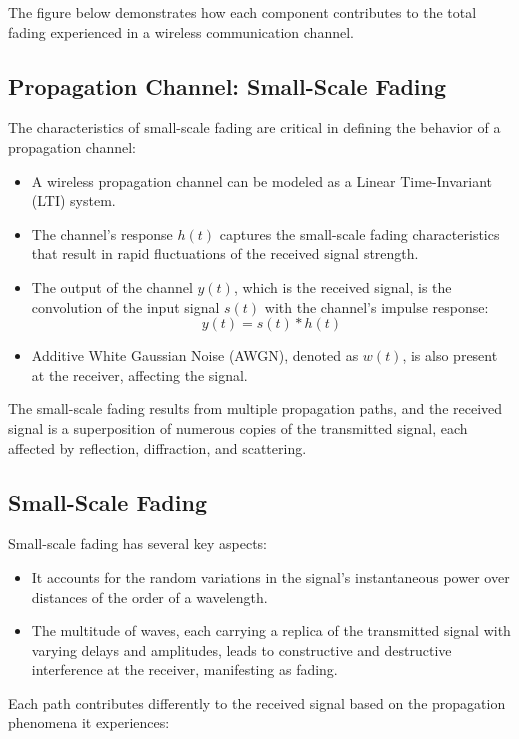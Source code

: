 The figure below demonstrates how each component contributes to the total fading experienced in a wireless communication channel.


\subsection*{Propagation Channel: Small-Scale Fading}

The characteristics of small-scale fading are critical in defining the behavior of a propagation channel:

\begin{itemize}
    \item A wireless propagation channel can be modeled as a Linear Time-Invariant (LTI) system.
    \item The channel's response \( h(t) \) captures the small-scale fading characteristics that result in rapid fluctuations of the received signal strength.
    \item The output of the channel \( y(t) \), which is the received signal, is the convolution of the input signal \( s(t) \) with the channel's impulse response:
    \[
    y(t) = s(t) \ast h(t)
    \]
    \item Additive White Gaussian Noise (AWGN), denoted as \( w(t) \), is also present at the receiver, affecting the signal.
\end{itemize}

The small-scale fading results from multiple propagation paths, and the received signal is a superposition of numerous copies of the transmitted signal, each affected by reflection, diffraction, and scattering.
\subsection*{Small-Scale Fading}

Small-scale fading has several key aspects:

\begin{itemize}
    \item It accounts for the random variations in the signal's instantaneous power over distances of the order of a wavelength.
    \item The multitude of waves, each carrying a replica of the transmitted signal with varying delays and amplitudes, leads to constructive and destructive interference at the receiver, manifesting as fading.
\end{itemize}

Each path contributes differently to the received signal based on the propagation phenomena it experiences:

